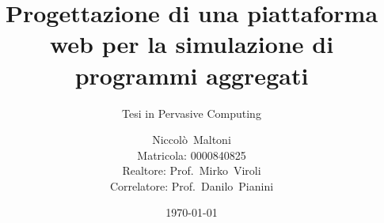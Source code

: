 \documentclass[
  usepdftitle=false,  %
  bigger,               %
  lualatex,           %
  italian             %
]{beamer}
\title[%
  WebProtelis%
]{%
  Progettazione di una piattaforma web per la simulazione di programmi aggregati%
}
\subtitle{Tesi in Pervasive Computing}
\author[Niccolò~Maltoni (0000840825)]{%
  Niccolò~Maltoni%
  \\\small{Matricola: 0000840825}%
  \\\vspace{10pt} \small{Realtore: Prof.~Mirko~Viroli \\Correlatore: Prof.~Danilo~Pianini}
}
\institute[]{%
  Alma Mater Studiorum - Università di Bologna\\%
  Campus di Cesena%
}
\date{\today}
\begin{document}
  \frame{\titlepage}
\end{document}
